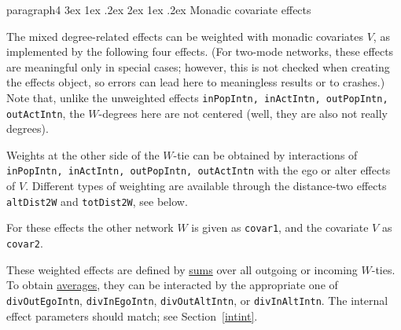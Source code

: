\documentclass[a4paper,fleqn,11pt]{article}
\makeatletter
\renewcommand\paragraph{\@startsection
   {paragraph}{4}{\z@}               %
   {3ex \@plus1ex \@minus.2ex}       %
   {2ex \@plus1ex \@minus.2ex}       %
   {\normalfont\normalsize\bfseries\itshape}}   %
\newcommand{\+}{\, + \,}
\makeatother
\begin{document}
\fi

\paragraph{Monadic covariate effects}

\noindent
The mixed degree-related effects can be weighted with monadic covariates $V$,
as implemented by the following four effects.
(For two-mode networks, these effects are meaningful only in special cases;
however, this is not checked when creating the effects object, so errors
can lead here to meaningless results or to crashes.)
Note that, unlike the unweighted effects
\texttt{inPopIntn, inActIntn, outPopIntn, outActIntn}, the $W$-degrees
here are not centered (well, they are also not really degrees).

Weights at the other side of the $W$-tie can be obtained by interactions of
\texttt{inPopIntn, inActIntn, outPopIntn, outActIntn} with the ego or
alter effects of $V$.
Different types of weighting are available through the distance-two
effects \texttt{altDist2W} and \texttt{totDist2W}, see below.

For these effects the other network $W$ is given as \texttt{covar1},
and the covariate $V$ as \texttt{covar2}.

These weighted effects are defined by \underline{sums} over all outgoing
or incoming $W$-ties. To obtain \underline{averages}, they can be interacted
by the appropriate one of  \texttt{divOutEgoIntn}, \texttt{divInEgoIntn},
\texttt{divOutAltIntn}, or \texttt{divInAltIntn}. The internal effect parameters
should match; see Section~\ref{intint}.
\end{document}
